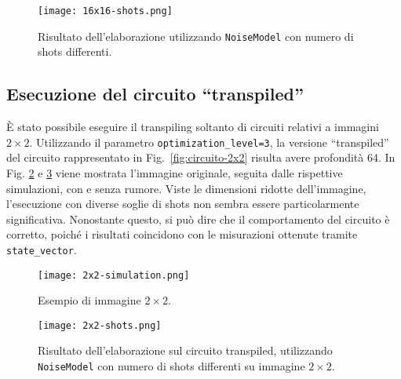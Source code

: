 \begin{figure}[ht]
	\centering
	\texttt{[image: 16x16-shots.png]}
	\caption{Risultato dell'elaborazione utilizzando \texttt{NoiseModel} con numero di shots differenti.}\label{fig:16x16-shots}
\end{figure}

\subsection{Esecuzione del circuito ``transpiled''}
È stato possibile eseguire il transpiling soltanto di circuiti relativi a
immagini $2 \times 2$. Utilizzando il
parametro \texttt{optimization\_level=3}, la versione ``transpiled'' del circuito
rappresentato in Fig.~\ref{fig:circuito-2x2} risulta avere profondità 64. 
In Fig. \ref{fig:2x2-simulation} e \ref{fig:2x2-shots} viene mostrata 
l'immagine originale, seguita dalle rispettive simulazioni, con e senza rumore.
Viste le dimensioni ridotte dell'immagine, l'esecuzione
con diverse soglie di shots non sembra essere particolarmente significativa.
Nonostante questo, si può dire che il comportamento del circuito è corretto, 
poiché i risultati coincidono con le misurazioni ottenute tramite \texttt{state\_vector}.

\begin{figure}[ht]
	\centering
	\texttt{[image: 2x2-simulation.png]}
	\caption{Esempio di immagine $2\times2$.}\label{fig:2x2-simulation}
\end{figure}

\begin{figure}[ht]
	\centering
	\texttt{[image: 2x2-shots.png]}
	\caption{Risultato dell'elaborazione sul circuito transpiled, 
	utilizzando \texttt{NoiseModel} con numero di shots differenti 
	su immagine $2\times2$.}\label{fig:2x2-shots}
\end{figure}


